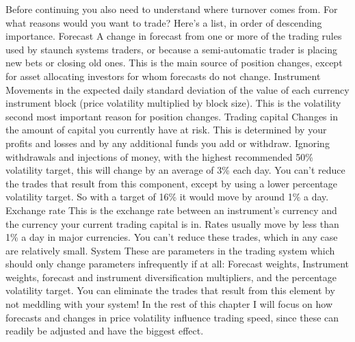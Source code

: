 \begin{englishblock} Before continuing you also need to understand where turnover comes from. For what reasons would you want to trade? Here's a list, in order of descending importance. Forecast A change in forecast from one or more of the trading rules used by staunch systems traders, or because a semi-automatic trader is placing new bets or closing old ones. This is the main source of position changes, except for asset allocating investors for whom forecasts do not change. Instrument Movements in the expected daily standard deviation of the value of each currency instrument block (price volatility multiplied by block size). This is the volatility second most important reason for position changes. Trading capital Changes in the amount of capital you currently have at risk. This is determined by your profits and losses and by any additional funds you add or withdraw. Ignoring withdrawals and injections of money, with the highest recommended 50\% volatility target, this will change by an average of 3\% each day. You can't reduce the trades that result from this component, except by using a lower percentage volatility target. So with a target of 16\% it would move by around 1\% a day. Exchange rate This is the exchange rate between an instrument's currency and the currency your current trading capital is in. Rates usually move by less than 1\% a day in major currencies. You can't reduce these trades, which in any case are relatively small. System These are parameters in the trading system which should only change parameters infrequently if at all: Forecast weights, Instrument weights, forecast and instrument diversification multipliers, and the percentage volatility target. You can eliminate the trades that result from this element by not meddling with your system! In the rest of this chapter I will focus on how forecasts and changes in price volatility influence trading speed, since these can readily be adjusted and have the biggest effect. \end{englishblock}

